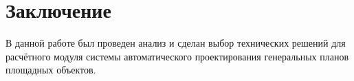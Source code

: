 \section*{\Large{Заключение}}

В данной работе был проведен анализ и сделан выбор технических решений для расчётного модуля системы
автоматического проектирования генеральных планов площадных объектов.
